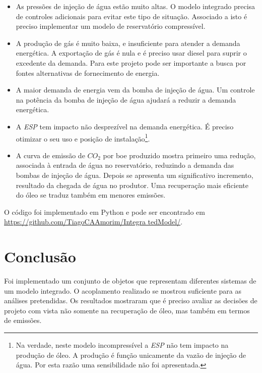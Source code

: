 \documentclass[final,5p]{elsarticle}
\numberwithin{equation}{section}
\begin{document}
        \begin{itemize}
            \item As pressões de injeção de água estão muito altas. O modelo integrado precisa de controles adicionais para evitar este tipo de situação. Associado a isto é preciso implementar um modelo de reservatório compressível.
            \item A produção de gás é muito baixa, e insuficiente para atender a demanda energética. A exportação de gás é nula e é preciso usar diesel para suprir o excedente da demanda. Para este projeto pode ser importante a busca por fontes alternativas de fornecimento de energia.
            \item A maior demanda de energia vem da bomba de injeção de água. Um controle na potência da bomba de injeção de água ajudará a reduzir a demanda energética.
            \item A \emph{ESP} tem impacto não desprezível na demanda energética. É preciso otimizar o seu uso e posição de instalação\footnote{Na verdade, neste modelo incompressível a \emph{ESP} não tem impacto na produção de óleo. A produção é função unicamente da vazão de injeção de água. Por esta razão uma sensibilidade não foi apresentada.}.
            \item A curva de emissão de $CO_2$ por boe produzido mostra primeiro uma redução, associada à entrada de água no reservatório, reduzindo a demanda das bombas de injeção de água. Depois se apresenta um significativo incremento, resultado da chegada de água no produtor. Uma recuperação mais eficiente do óleo se traduz também em menores emissões.
        \end{itemize}

        O código foi implementado em Python e pode ser encontrado em \href{https://github.com/TiagoCAAmorim/IntegratedModel/}{https://github.com/TiagoCAAmorim/Integra tedModel/}.

    \section{Conclusão}
        Foi implementado um conjunto de objetos que representam diferentes sistemas de um modelo integrado. O acoplamento realizado se mostrou suficiente para as análises pretendidas.
        Os resultados mostraram que é preciso avaliar as decisões de projeto com vista não somente na recuperação de óleo, mas também em termos de emissões.

\end{document}
